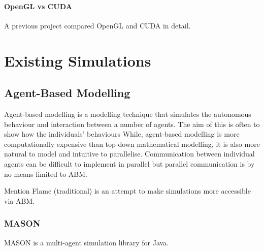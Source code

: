 \documentclass{UoYCSproject}
\begin{document}

\paragraph{OpenGL vs CUDA}
A previous project compared OpenGL and CUDA in detail.

\section{Existing Simulations}

\subsection{Agent-Based Modelling}
\label{abm}
Agent-based modelling is a modelling technique that simulates the autonomous behaviour and interaction between a number of agents. The aim of this is often to show how the individuals' behaviours 
While, agent-based modelling is more computationally expensive than top-down mathematical modelling, it is also more natural to model and intuitive to parallelise\cite{flame_simulation}.
Communication between individual agents can be difficult to implement in parallel but parallel communication is by no means limited to ABM.


Mention Flame (traditional) is an attempt to make simulations more accessible via ABM.


\subsubsection{MASON}
MASON is a multi-agent simulation library for Java.


\end{document}

